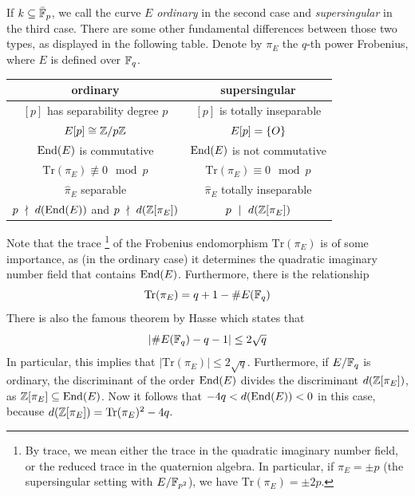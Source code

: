 If $k \subseteq \bar{\mathbb{F}}_p$, we call the curve $E$ \emph{ordinary} in the second case and \emph{supersingular} in the third case.
There are some other fundamental differences between those two types, as displayed in the following table.
Denote by $\pi_E$ the $q$-th power Frobenius, where $E$ is defined over $\mathbb{F}_q$.
\begin{center}
    \begin{tabular}{c | c}
        ordinary & supersingular \\
        \hline
        $[p]$ has separability degree $p$ & $[p]$ is totally inseparable \\
        $E[p] \cong \mathbb{Z}/p\mathbb{Z}$ & $E[p] = \{ O \}$ \\
        $\mathrm{End}(E)$ is commutative & $\mathrm{End}(E)$ is not commutative \\
        $\mathrm{Tr}(\pi_E) \not\equiv 0 \mod p$ & $\mathrm{Tr}(\pi_E) \equiv 0 \mod p$ \\
        $\hat{\pi}_E$ separable & $\hat{\pi}_E$ totally inseparable \\
        $p \ \nmid \  d(\mathrm{End}(E))$ and $p \ \nmid \  d(\mathbb{Z}[\pi_E])$ & $p \ \mid \  d(\mathbb{Z}[\pi_E])$
    \end{tabular}
\end{center}
Note that the trace
\footnote{By trace, we mean either the trace in the quadratic imaginary number field, or the reduced trace in the quaternion algebra. In particular, if $\pi_E = \pm p$ (the supersingular setting with $E/\mathbb{F}_{p^2}$), we have $\mathrm{Tr}(\pi_E) = \pm 2p$.}
of the Frobenius endomorphism $\mathrm{Tr}(\pi_E)$ is of some importance, as (in the ordinary case) it determines the quadratic imaginary number field that contains $\mathrm{End}(E)$.
Furthermore, there is the relationship
\begin{equation*}
    \mathrm{Tr}(\pi_E) = q + 1 - \#E(\mathbb{F}_q)
\end{equation*}
There is also the famous theorem by Hasse \cite[Thm V.1.1]{arithmetic_elliptic_curves} which states that
\begin{equation*}
    |\#E(\mathbb{F}_q) - q - 1| \leq 2\sqrt{q}
\end{equation*}
In particular, this implies that $|\mathrm{Tr}(\pi_E)| \leq 2\sqrt{q}$.
Furthermore, if $E/\mathbb{F}_q$ is ordinary, the discriminant of the order $\mathrm{End}(E)$ divides the discriminant $d(\mathbb{Z}[\pi_E])$, as $\mathbb{Z}[\pi_E] \subseteq \mathrm{End}(E)$.
Now it follows that $-4q < d(\mathrm{End}(E)) < 0$ in this case, because $d(\mathbb{Z}[\pi_E]) = \mathrm{Tr}(\pi_E)^2 - 4q$.

